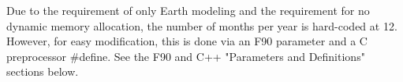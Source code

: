 
Due to the requirement of only Earth modeling and the requirement for no
dynamic memory allocation, the number of months per year is hard-coded
at 12.  However, for easy modification, this is done via an F90 parameter 
and a C preprocessor \#define.  See the F90 and C++ "Parameters and 
Definitions" sections below.
